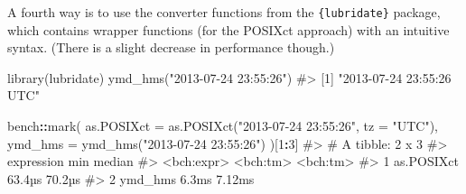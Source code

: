 \documentclass[
]{krantz}
\makeatletter
\newenvironment{Shaded}{\begin{snugshade}}{\end{snugshade}}
\newcommand{\CommentTok}[1]{\textcolor[rgb]{0.56,0.35,0.01}{\textit{#1}}}
\newcommand{\DataTypeTok}[1]{\textcolor[rgb]{0.13,0.29,0.53}{#1}}
\newcommand{\DecValTok}[1]{\textcolor[rgb]{0.00,0.00,0.81}{#1}}
\newcommand{\KeywordTok}[1]{\textcolor[rgb]{0.13,0.29,0.53}{\textbf{#1}}}
\newcommand{\NormalTok}[1]{#1}
\newcommand{\OperatorTok}[1]{\textcolor[rgb]{0.81,0.36,0.00}{\textbf{#1}}}
\newcommand{\StringTok}[1]{\textcolor[rgb]{0.31,0.60,0.02}{#1}}
\newenvironment{kframe}{%
\medskip{}
\setlength{\fboxsep}{.8em}
 \def\at@end@of@kframe{}%
 \ifinner\ifhmode%
  \def\at@end@of@kframe{\end{minipage}}%
  \begin{minipage}{\columnwidth}%
 \fi\fi%
 \def\FrameCommand##1{\hskip\@totalleftmargin \hskip-\fboxsep
 \colorbox{shadecolor}{##1}\hskip-\fboxsep
     \hskip-\linewidth \hskip-\@totalleftmargin \hskip\columnwidth}%
 \MakeFramed {\advance\hsize-\width
   \@totalleftmargin\z@ \linewidth\hsize
   \@setminipage}}%
 {\par\unskip\endMakeFramed%
 \at@end@of@kframe}
\renewenvironment{Shaded}{\begin{kframe}}{\end{kframe}}
\renewcommand{\KeywordTok} [1]{\textcolor[rgb]{0.00,0.44,0.13}{{#1}}}
\renewcommand{\DataTypeTok}[1]{\textcolor[rgb]{0.56,0.13,0.00}{{#1}}}
\renewcommand{\DecValTok}  [1]{\textcolor[rgb]{0.25,0.63,0.44}{{#1}}}
\renewcommand{\StringTok}  [1]{\textcolor[rgb]{0.25,0.44,0.63}{{#1}}}
\renewcommand{\CommentTok} [1]{\textcolor[rgb]{0.38,0.63,0.69}{{#1}}}
\renewcommand{\NormalTok}  [1]{{#1}}
\makeatother
\begin{document}
\begin{Shaded}
\end{Shaded}

A fourth way is to use the converter functions from the \texttt{\{lubridate\}} package, which contains wrapper functions (for the POSIXct approach) with an intuitive syntax. (There is a slight decrease in performance though.)

\begin{Shaded}
\begin{Highlighting}[]
\KeywordTok{library}\NormalTok{(lubridate)}
\KeywordTok{ymd_hms}\NormalTok{(}\StringTok{"2013-07-24 23:55:26"}\NormalTok{)}
\CommentTok{#> [1] "2013-07-24 23:55:26 UTC"}

\NormalTok{bench}\OperatorTok{::}\KeywordTok{mark}\NormalTok{(}
  \DataTypeTok{as.POSIXct =} \KeywordTok{as.POSIXct}\NormalTok{(}\StringTok{"2013-07-24 23:55:26"}\NormalTok{, }\DataTypeTok{tz =} \StringTok{"UTC"}\NormalTok{),}
  \DataTypeTok{ymd_hms =} \KeywordTok{ymd_hms}\NormalTok{(}\StringTok{"2013-07-24 23:55:26"}\NormalTok{)}
\NormalTok{)[}\DecValTok{1}\OperatorTok{:}\DecValTok{3}\NormalTok{]}
\CommentTok{#> # A tibble: 2 x 3}
\CommentTok{#>   expression      min   median}
\CommentTok{#>   <bch:expr> <bch:tm> <bch:tm>}
\CommentTok{#> 1 as.POSIXct   63.4µs   70.2µs}
\CommentTok{#> 2 ymd_hms       6.3ms   7.12ms}
\end{Highlighting}
\end{Shaded}
\end{document}
